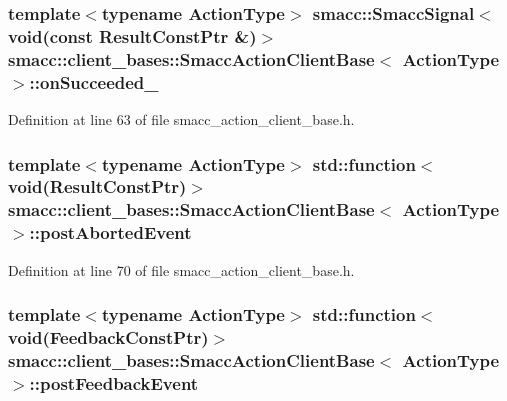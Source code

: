 \subsubsection[{\texorpdfstring{on\+Succeeded\+\_\+}{onSucceeded_}}]{\setlength{\rightskip}{0pt plus 5cm}template$<$typename Action\+Type$>$ {\bf smacc\+::\+Smacc\+Signal}$<$void(const Result\+Const\+Ptr \&)$>$ {\bf smacc\+::client\+\_\+bases\+::\+Smacc\+Action\+Client\+Base}$<$ Action\+Type $>$\+::on\+Succeeded\+\_\+}\hypertarget{classsmacc_1_1client__bases_1_1SmaccActionClientBase_afa1d615e16c9e825d815a3a3ccaa61df}{}\label{classsmacc_1_1client__bases_1_1SmaccActionClientBase_afa1d615e16c9e825d815a3a3ccaa61df}


Definition at line 63 of file smacc\+\_\+action\+\_\+client\+\_\+base.\+h.

\subsubsection[{\texorpdfstring{post\+Aborted\+Event}{postAbortedEvent}}]{\setlength{\rightskip}{0pt plus 5cm}template$<$typename Action\+Type$>$ std\+::function$<$void(Result\+Const\+Ptr)$>$ {\bf smacc\+::client\+\_\+bases\+::\+Smacc\+Action\+Client\+Base}$<$ Action\+Type $>$\+::post\+Aborted\+Event}\hypertarget{classsmacc_1_1client__bases_1_1SmaccActionClientBase_a9ca2952ededeec233ee6d8a9a39c680b}{}\label{classsmacc_1_1client__bases_1_1SmaccActionClientBase_a9ca2952ededeec233ee6d8a9a39c680b}


Definition at line 70 of file smacc\+\_\+action\+\_\+client\+\_\+base.\+h.

\subsubsection[{\texorpdfstring{post\+Feedback\+Event}{postFeedbackEvent}}]{\setlength{\rightskip}{0pt plus 5cm}template$<$typename Action\+Type$>$ std\+::function$<$void(Feedback\+Const\+Ptr)$>$ {\bf smacc\+::client\+\_\+bases\+::\+Smacc\+Action\+Client\+Base}$<$ Action\+Type $>$\+::post\+Feedback\+Event}\hypertarget{classsmacc_1_1client__bases_1_1SmaccActionClientBase_ac754fb0adfc982fe1adde0d92842a33b}{}\label{classsmacc_1_1client__bases_1_1SmaccActionClientBase_ac754fb0adfc982fe1adde0d92842a33b}


